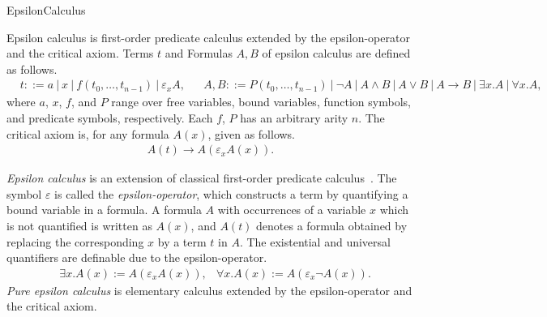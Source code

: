 \newcommand{\EC}{\ensuremath{\mathbf{EC}}\xspace}
\newcommand{\ECeps}{\ensuremath{\EC_\varepsilon}\xspace}

\calculusAcronym{}




\maketitle

\begin{entry}{EpsilonCalculus}  


\begin{calculus}
Epsilon calculus is first-order predicate calculus extended by the
epsilon-operator and the critical axiom.  Terms $t$ and Formulas $A,
B$ of epsilon calculus are defined as follows.
\begin{align*}
  & t ::= a ~|~ x ~|~ f(t_0, \ldots, t_{n-1}) ~|~ \varepsilon_x A, 
  && A, B ::= P(t_0, \ldots, t_{n-1}) ~|~ \neg A ~|~ A \land B ~|~ A \lor B ~|~ A \to B ~|~ \exists x. A ~|~ \forall x. A,
\end{align*}
where $a$, $x$, $f$, and $P$ range over free variables, bound
variables, function symbols, and predicate symbols, respectively.
Each $f$, $P$ has an arbitrary arity $n$.
The critical axiom is, for any formula $A(x)$, given as follows.
\begin{align*}
  A(t) \to A(\varepsilon_xA(x)).
\end{align*}
\end{calculus}

\begin{clarifications}
  \emph{Epsilon calculus} is an extension of classical first-order
  predicate
  calculus~\cite{HilbertBernays1939,MoserZach06,AvigadZach13}.  The
  symbol $\varepsilon$ is called the \emph{epsilon-operator}, which
  constructs a term by quantifying a bound variable in a formula.  A
  formula $A$ with occurrences of a variable $x$ which is not
  quantified is written as $A(x)$, and $A(t)$ denotes a formula
  obtained by replacing the corresponding $x$ by a term $t$ in $A$.
  The existential and universal quantifiers are definable due to the
  epsilon-operator.
  \begin{align*}
    & \exists x. A(x) := A(\varepsilon_x A(x)), & \forall x. A(x) := A(\varepsilon_x \neg A(x)).
  \end{align*}
  \emph{Pure epsilon calculus} is elementary calculus extended by the
  epsilon-operator and the critical axiom.
\end{clarifications}


\end{entry}
